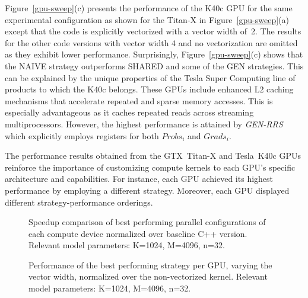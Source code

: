 \begin{comment}
\begin{figure*}[tb]	%
  \centering
  \epsfig{file=plots/k40-1024-strategies-w2.eps, width=\textwidth}
  \caption{Execution time of 1000 \textit{update\_phi} invocations using the K40c GPU, with
  explicit kernel vectorization of width 2, across a sweep of
  \textit{update\_phi} thread block
  sizes. Relevant model parameters: K=1024, M=4096, n=32.}
  \label{k40-w2-sweep}
\end{figure*}
\end{comment}

Figure~\ref{gpu-sweep}(c) presents the performance of the K40c GPU
for the same experimental configuration as shown for the \mbox{Titan-X} in
Figure~\ref{gpu-sweep}(a) except that the code
is explicitly vectorized with a vector width of~2. The results
for the other code versions with vector width 4 and no vectorization are
omitted as they exhibit lower performance.
%
Surprisingly, Figure~\ref{gpu-sweep}(c) shows that the NAIVE strategy
outperforms SHARED and some of the GEN strategies. This can be explained by the
unique properties of the Tesla Super Computing line of products to which the
K40c belongs. These GPUs include enhanced L2 caching mechanisms that
accelerate repeated and sparse memory accesses. This is especially advantageous
as it caches repeated reads across streaming multiprocessors. However, the
highest performance is attained by \textit{GEN-RRS} which explicitly employs
registers for both $Probs_i$ and $Grads_i$.

The performance results obtained from the GTX~\mbox{Titan-X} and Tesla~K40c GPUs
reinforce the importance of customizing compute kernels to each GPU's specific
architecture and capabilities. For instance, each GPU achieved its highest
performance by employing a different strategy. Moreover, each GPU displayed
different strategy-performance orderings.

\begin{figure}[tb]	%
  \centering
  \caption{Speedup comparison of best performing parallel configurations of
  each compute device normalized over baseline C++ version. Relevant model
  parameters: K=1024, M=4096, n=32.}
  \label{gpus-fig}
\end{figure}

\begin{figure}[tb]	%
  \centering
  \caption{Performance of the best performing strategy per GPU, varying the
  vector width, normalized over the non-vectorized kernel. Relevant model
  parameters: K=1024, M=4096, n=32.}
  \label{gpus-v-sweep}
\end{figure}

